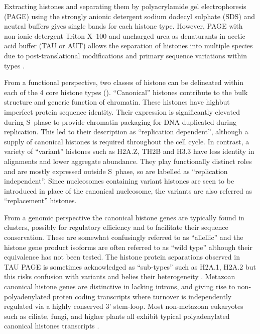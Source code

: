   Extracting histones and separating them by polyacrylamide gel electrophoresis (PAGE) 
  using the strongly anionic detergent sodium dodecyl sulphate (SDS) and neutral buffers 
  gives single bands for each histone type. 
  However, PAGE with non-ionic detergent Triton X--100 and uncharged urea as denaturants
  in acetic acid buffer (TAU or AUT) allows the separation of histones into multiple species 
  due to post-translational modifications and primary sequence variations within types \citep{PAGEND}.

  From a functional perspective, two classes of histone can be delineated 
  within each of the 4 core histone types (). 
  ``Canonical'' histones contribute to the bulk structure and generic function of chromatin. 
  These histones have highbut imperfect protein sequence identity.
  Their expression is significantly elevated during S~phase to provide chromatin packaging 
  for DNA duplicated during replication. This led to their description as ``replication dependent'', 
  although a supply of canonical histones is required throughout the cell cycle. 
  In contrast, a variety of ``variant'' histones such as H2A.Z, TH2B and H3.3 
  have less identity in alignments and lower aggregate abundance. 
  They play functionally distinct roles and are mostly expressed outside S~phase, 
  so are labelled as ``replication independent''. 
  Since nucleosomes containing variant histones are seen to be introduced in place of the canonical nucleosome, 
  the variants are also referred as ``replacement'' histones.
  
  From a genomic perspective the canonical histone genes are typically found in  clusters, 
  possibly for regulatory efficiency and to facilitate their sequence conservation. 
  These are somewhat confusingly referred to as ``allellic'' 
  and the histone gene product isoforms are often referred to as ``wild type'' although their equivalence has not been tested.
  The histone protein separations observed in TAU PAGE is sometimes acknowledged as ``sub-types'' 
  such as H2A.1, H2A.2 but this risks confusion with variants and belies their heterogeneity \addref{}. 
  Metazoan canonical histone genes are distinctive in lacking introns, 
  and giving rise to non-polyadenylated proten coding transcripts 
  where turnover is independently regulated via a highly conserved 3' stem-loop. 
  Most non-metazoan eukaryotes such as ciliate, fungi, and higher plants 
  all exhibit typical polyadenylated canonical histones transcripts \addref{}.

